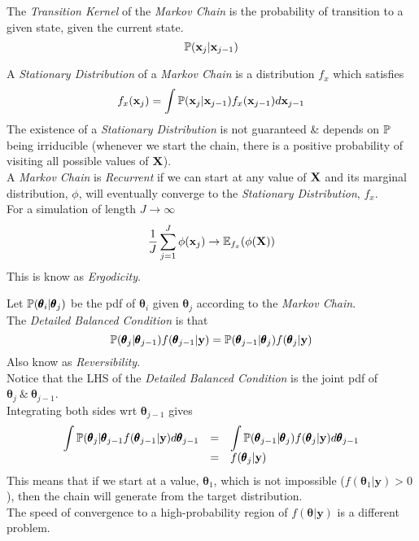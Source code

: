 \documentclass[11pt,a4paper]{article}
\begin{document}
The \textit{Transition Kernel} of the \textit{Markov Chain} is the probability of transition to a given state, given the current state.
$$\mathbb{P}(\textbf{x}_j|\textbf{x}_{j-1})$$

A \textit{Stationary Distribution} of a \textit{Markov Chain} is a distribution $f_x$ which satisfies
$$f_x(\textbf{x}_j)=\int \mathbb{P}(\textbf{x}_j|\textbf{x}_{j-1})f_x(\textbf{x}_{j-1})d\textbf{x}_{j-1}$$
\nb The existence of a \textit{Stationary Distribution} is not guaranteed \& depends on $\mathbb{P}$ being irriducible (\ie whenever we start the chain, there is a positive probability of visiting all possible values of $\textbf{X}$).\\

A \textit{Markov Chain} is \textit{Recurrent} if we can start at any value of $\textbf{X}$ and its marginal distribution, $\phi$, will eventually converge to the \textit{Stationary Distribution}, $f_x$.\\
For a simulation of length $J\to\infty$
$$\frac1J\sum_{j=1}^J\phi(\textbf{x}_j)\to\mathbb{E}_{f_x}(\phi(\textbf{X}))$$
\nb This is know as \textit{Ergodicity}.\\


Let $\mathbb{P}(\pmb\theta_i|\pmb\theta_j)$ be the pdf of $\pmb\theta_i$ given $\pmb\theta_j$ according to the \textit{Markov Chain}.\\
The \textit{Detailed Balanced Condition} is that
$$\mathbb{P}(\pmb\theta_j|\pmb\theta_{j-1})f(\pmb\theta_{j-1}|\textbf{y})=\mathbb{P}(\pmb\theta_{j-1}|\pmb\theta_j)f(\pmb\theta_j|\textbf{y})$$
\nb Also know as \textit{Reversibility}.\\

Notice that the LHS of the \textit{Detailed Balanced Condition} is the joint pdf of $\pmb\theta_j\ \&\ \pmb\theta_{j-1}$.\\
Integrating both sides wrt $\pmb\theta_{j-1}$ gives
\[\begin{array}{rcl}
\displaystyle\int\mathbb{P}(\pmb\theta_j|\pmb\theta_{j-1}f(\pmb\theta_{j-1}|\textbf{y})d\pmb\theta_{j-1}&=&\displaystyle\int\mathbb{P}(\pmb\theta_{j-1}|\pmb\theta_j)f(\pmb\theta_j|\textbf{y})d\pmb\theta_{j-1}\\
&=&f(\pmb\theta_j|\textbf{y})
\end{array}\]
This means that if we start at a value, $\pmb\theta_1$, which is not impossible (\ie $f(\pmb\theta_1|\textbf{y})>0$), then the chain will generate from the target distribution.\\
\nb The speed of convergence to a high-probability region of $f(\pmb\theta|\textbf{y})$ is a different problem.
\end{document}
